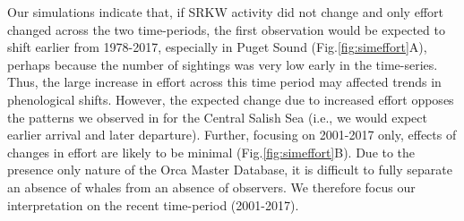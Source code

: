 \documentclass{article}
\begin{document}
\par Our simulations indicate that, if SRKW activity did not change and only effort changed across the two time-periods, the first observation would be expected to shift earlier from 1978-2017, especially in Puget Sound (Fig.\ref{fig:simeffort}A), perhaps because the number of sightings was very low early in the time-series. Thus, the large increase in effort across this time period may affected trends in phenological shifts.  However, the expected change due to increased effort opposes the patterns we observed in for the Central Salish Sea (i.e., we would expect earlier arrival and later departure). Further, focusing on 2001-2017 only, effects of changes in effort are likely to be minimal (Fig.\ref{fig:simeffort}B). Due to the presence only nature of the Orca Master Database, it is difficult to fully separate an absence of whales from an absence of observers. We therefore focus our interpretation on the recent time-period (2001-2017).




\pagebreak
\end{document}
